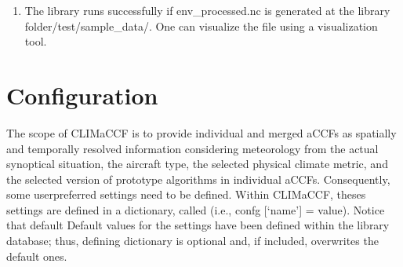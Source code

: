 \documentclass[a4paper,11pt,english]{sphinxmanual}
\begin{document}
\begin{sphinxVerbatim}[commandchars=\\\{\}]
  
\end{sphinxVerbatim}
\begin{enumerate}
%
\setcounter{enumi}{3}
\item {} 
\sphinxAtStartPar
The library runs successfully if env\_processed.nc is generated at the library folder/test/sample\_data/. One can visualize the file using a visualization tool.

\end{enumerate}


\section{Configuration}
\label{\detokenize{gStarted:configuration}}
\sphinxAtStartPar
The scope of CLIMaCCF is to provide individual and merged aCCFs as spatially and temporally resolved information considering meteorology from the actual synoptical situation, the aircraft type, the selected physical climate metric, and the selected version of prototype algorithms in individual aCCFs. Consequently, some user\sphinxhyphen{}preferred settings need to
be defined. Within CLIMaCCF, theses settings are defined in a dictionary, called  (i.e., confg {[}‘name’{]} = value). Notice that default
Default values for the settings have been defined within the library database; thus, defining dictionary  is optional and, if included, overwrites the default ones.
\end{document}
